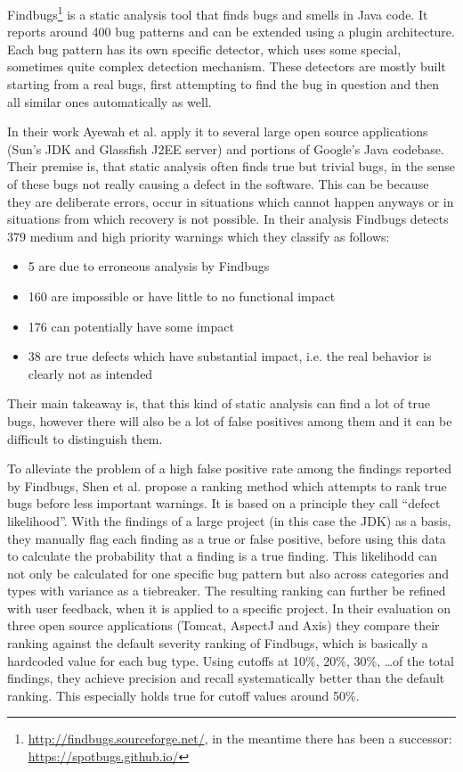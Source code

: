 Findbugs\footnote{\url{http://findbugs.sourceforge.net/}, in the meantime there has been a successor: \url{https://spotbugs.github.io/}} is a static analysis tool that finds bugs and smells in Java code.
It reports around 400 bug patterns and can be extended using a plugin architecture.
Each bug pattern has its own specific detector, which uses some special, sometimes quite complex detection mechanism.
These detectors are mostly built starting from a real bugs, first attempting to find the bug in question and then all similar ones automatically as well.

In their work Ayewah et al. \cite{ayewah2007evaluating} apply it to several large open source applications (Sun's JDK and Glassfish J2EE server) and portions of Google's Java codebase.
Their premise is, that static analysis often finds true but trivial bugs, in the sense of these bugs not really causing a defect in the software.
This can be because they are deliberate errors, occur in situations which cannot happen anyways or in situations from which recovery is not possible.
In their analysis Findbugs detects 379 medium and high priority warnings which they classify as follows:
\begin{itemize}
    \item 5 are due to erroneous analysis by Findbugs
    \item 160 are impossible or have little to no functional impact
    \item 176 can potentially have some impact
    \item 38 are true defects which have substantial impact, i.e. the real behavior is clearly not as intended
\end{itemize}
Their main takeaway is, that this kind of static analysis can find a lot of true bugs, however there will also be a lot of false positives among them and it can be difficult to distinguish them.

To alleviate the problem of a high false positive rate among the findings reported by Findbugs, Shen et al. \cite{shen2011efindbugs} propose a ranking method which attempts to rank true bugs before less important warnings.
It is based on a principle they call ``defect likelihood''.
With the findings of a large project (in this case the JDK) as a basis, they manually flag each finding as a true or false positive, before using this data to calculate the probability that a finding is a true finding.
This likelihodd can not only be calculated for one specific bug pattern but also across categories and types with variance as a tiebreaker.
The resulting ranking can further be refined with user feedback, when it is applied to a specific project.
In their evaluation on three open source applications (Tomcat, AspectJ and Axis) they compare their ranking against the default severity ranking of Findbugs, which is basically a hardcoded value for each bug type.
Using cutoffs at 10\%, 20\%, 30\%, \ldots of the total findings, they achieve precision and recall systematically better than the default ranking.
This especially holds true for cutoff values around 50\%.

